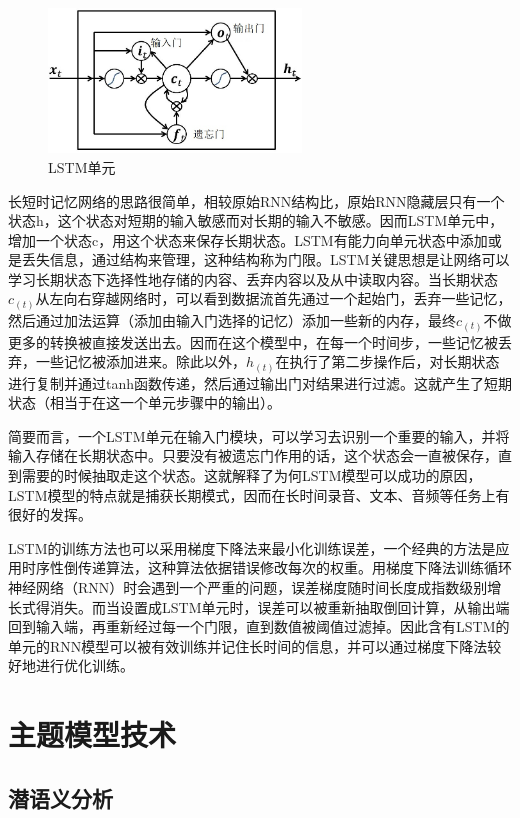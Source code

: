 \documentclass[winfonts,master,oneside,nobackinfo]{njuthesis}
\begin{document}
\begin{figure}[h]
\centering
\includegraphics[width=0.6\textwidth]{./figure/LSTM.jpg}
\caption{LSTM单元}
\label{lstm}
\end{figure}

长短时记忆网络的思路很简单，相较原始RNN结构比，原始RNN隐藏层只有一个状态h，这个状态对短期的输入敏感而对长期的输入不敏感。因而LSTM单元中，增加一个状态c，用这个状态来保存长期状态。LSTM有能力向单元状态中添加或是丢失信息，通过结构来管理，这种结构称为门限。LSTM关键思想是让网络可以学习长期状态下选择性地存储的内容、丢弃内容以及从中读取内容。当长期状态${ c } _ { ( t ) }$从左向右穿越网络时，可以看到数据流首先通过一个起始门，丢弃一些记忆，然后通过加法运算（添加由输入门选择的记忆）添加一些新的内存，最终${ c } _ { ( t ) }$不做更多的转换被直接发送出去。因而在这个模型中，在每一个时间步，一些记忆被丢弃，一些记忆被添加进来。除此以外，${ h } _ { ( t ) }$在执行了第二步操作后，对长期状态进行复制并通过tanh函数传递，然后通过输出门对结果进行过滤。这就产生了短期状态（相当于在这一个单元步骤中的输出）。

简要而言，一个LSTM单元在输入门模块，可以学习去识别一个重要的输入，并将输入存储在长期状态中。只要没有被遗忘门作用的话，这个状态会一直被保存，直到需要的时候抽取走这个状态。这就解释了为何LSTM模型可以成功的原因，LSTM模型的特点就是捕获长期模式，因而在长时间录音、文本、音频等任务上有很好的发挥。

LSTM的训练方法也可以采用梯度下降法来最小化训练误差，一个经典的方法是应用时序性倒传递算法，这种算法依据错误修改每次的权重。用梯度下降法训练循环神经网络（RNN）时会遇到一个严重的问题，误差梯度随时间长度成指数级别增长式得消失。而当设置成LSTM单元时，误差可以被重新抽取倒回计算，从输出端回到输入端，再重新经过每一个门限，直到数值被阈值过滤掉。因此含有LSTM的单元的RNN模型可以被有效训练并记住长时间的信息，并可以通过梯度下降法较好地进行优化训练。

\section{主题模型技术}

\subsection{潜语义分析}
\end{document}
